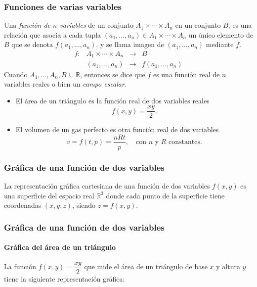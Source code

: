 \begin{frame}
	\frametitle{Funciones de varias variables}
	\begin{definicion}
		Una \emph{función de $n$ variables} de un conjunto $A_1\times \cdots \times A_n$ en un conjunto $B$, es una relación que
		asocia a cada tupla $(a_1,\ldots,a_n)\in A_1\times \cdots\times A_n$ un único elemento de $B$ que se denota
		$f(a_1,\ldots,a_n)$, y se llama imagen de $(a_1,\ldots,a_n)$ mediante $f$.
		\[
			\begin{array}{lccc}
				f: & A_1\times\cdots\times A_n & \longrightarrow & B                 \\
				   & (a_1,\ldots,a_n)          & \longrightarrow & f(a_1,\ldots,a_n) 
			\end{array}
		\]
		Cuando $A_1,\ldots,A_n,B\subseteq \mathbb{R}$, entonces se dice que $f$ es
		una función real de $n$ variables reales o bien un \emph{campo escalar}.
	\end{definicion}
	
	\begin{itemize}
		\item El área de un triángulo es la función real de dos variables reales 
		      \[ f(x,y)=\frac{xy}{2}.\]
		\item El volumen de un gas perfecto es otra función real de dos variables
		      \[
		      	v=f(t,p)=\frac{nRt}{p},\quad \mbox{con $n$ y $R$ constantes.}
		      \]
	\end{itemize}
\end{frame}


\begin{frame}
	\frametitle{Gráfica de una función de dos variables}
	La representación gráfica cartesiana de una función de dos variables $f(x,y)$ es una superficie del espacio real
	$\mathbb{R}^3$ donde cada punto de la superficie tiene coordenadas $(x,y,z)$, siendo $z=f(x,y)$.
	\begin{center}
		\scalebox{1}{}
	\end{center}
\end{frame}


\begin{frame}
	\frametitle{Gráfica de una función de dos variables}
	\framesubtitle{Gráfica del área de un triángulo}
	La función $f(x,y)=\dfrac{xy}{2}$ que mide el área de un triángulo de base $x$ y altura $y$ tiene la siguiente representación gráfica:
	\begin{center}
		\scalebox{1}{}
	\end{center}
\end{frame}


